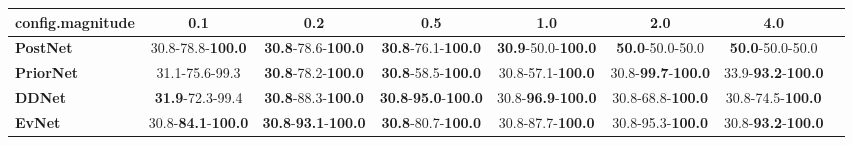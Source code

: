\begin{tabular}{lccccccc}
\toprule
\textbf{config.magnitude} &                                0.1 &                                         0.2 &                                         0.5 &                                1.0 &                                2.0 &                                4.0 \\
\midrule
\textbf{PostNet } &           30.8-78.8-\textbf{100.0} &           \textbf{30.8}-78.6-\textbf{100.0} &           \textbf{30.8}-76.1-\textbf{100.0} &  \textbf{30.9}-50.0-\textbf{100.0} &            \textbf{50.0}-50.0-50.0 &            \textbf{50.0}-50.0-50.0 \\
\textbf{PriorNet} &                     31.1-75.6-99.3 &           \textbf{30.8}-78.2-\textbf{100.0} &           \textbf{30.8}-58.5-\textbf{100.0} &           30.8-57.1-\textbf{100.0} &  30.8-\textbf{99.7}-\textbf{100.0} &  33.9-\textbf{93.2}-\textbf{100.0} \\
\textbf{DDNet   } &            \textbf{31.9}-72.3-99.4 &           \textbf{30.8}-88.3-\textbf{100.0} &  \textbf{30.8}-\textbf{95.0}-\textbf{100.0} &  30.8-\textbf{96.9}-\textbf{100.0} &           30.8-68.8-\textbf{100.0} &           30.8-74.5-\textbf{100.0} \\
\textbf{EvNet   } &  30.8-\textbf{84.1}-\textbf{100.0} &  \textbf{30.8}-\textbf{93.1}-\textbf{100.0} &           \textbf{30.8}-80.7-\textbf{100.0} &           30.8-87.7-\textbf{100.0} &           30.8-95.3-\textbf{100.0} &  30.8-\textbf{93.2}-\textbf{100.0} \\
\bottomrule
\end{tabular}
